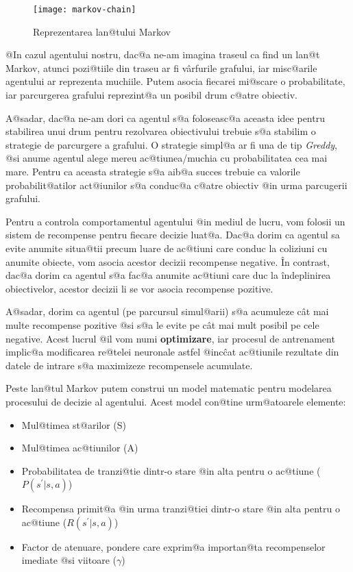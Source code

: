 \begin{figure}[h]
	\centering
	\texttt{[image: markov-chain]}
	\caption{Reprezentarea lan@tului Markov}
	\label{fig:markov-chain}
\end{figure}


@In cazul agentului nostru, dac@a ne-am imagina traseul ca find un lan@t Markov, atunci pozi@tiile din traseu ar fi v\^ arfurile grafului, iar misc@arile agentului ar reprezenta muchiile. Putem asocia fiecarei mi@scare o probabilitate, iar parcurgerea grafului reprezint@a un posibil drum c@atre obiectiv.

A@sadar, dac@a ne-am dori ca agentul s@a foloseasc@a aceasta idee pentru stabilirea unui drum pentru rezolvarea obiectivului trebuie s@a stabilim o strategie de parcurgere a grafului.
O strategie simpl@a ar fi una de tip {\sl Greddy}, @si anume agentul alege mereu ac@tiunea/muchia cu probabilitatea cea mai mare. Pentru ca aceasta strategie s@a aib@a succes trebuie ca valorile probabilit@atilor act@iunilor s@a conduc@a c@atre obiectiv @in urma parcugerii grafului.

Pentru a controla comportamentul agentului @in mediul de lucru, vom folosii un sistem de recompense pentru fiecare decizie luat@a. Dac@a dorim ca agentul sa evite anumite situa@tii precum luare de ac@tiuni care conduc la coliziuni cu anumite obiecte, vom asocia acestor decizii recompense negative. \^In contrast, dac@a dorim ca agentul s@a fac@a anumite ac@tiuni care duc la \^indeplinirea obiectivelor, acestor decizii li se vor asocia recompense pozitive.

A@sadar, dorim ca agentul (pe parcursul simul@arii) s@a acumuleze c\^ at mai multe recompense pozitive @si s@a le evite pe c\^ at mai mult posibil pe cele negative. Acest lucrul @il vom numi \textbf{optimizare}, iar procesul de antrenament implic@a modificarea re@telei neuronale astfel @inc\^ cat ac@tiunile rezultate din datele de intrare s@a maximizeze recompensele acumulate.

Peste lan@tul Markov putem construi un model matematic pentru modelarea procesului de decizie al agentului. Acest model con@tine urm@atoarele elemente:

\begin{itemize}
	\item Mul@timea st@arilor (S)
	\item Mul@timea ac@tiunilor (A)
	\item Probabilitatea de tranzi@tie dintr-o stare @in alta pentru o ac@tiune ($P(s^{\prime}|s, a)$)
	\item Recompensa primit@a @in urma tranzi@tiei dintr-o stare @in alta pentru o ac@tiune ($R(s^{\prime}|s, a)$)
	\item Factor de atenuare, pondere care exprim@a importan@ta recompenselor imediate @si viitoare ($\gamma$)
\end{itemize}

